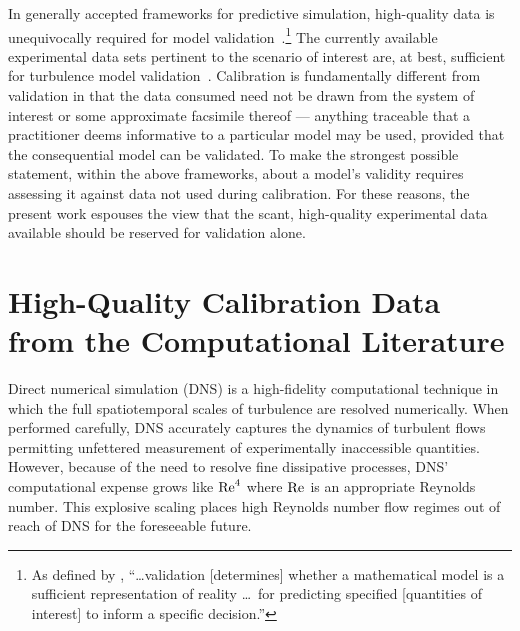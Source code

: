 In generally accepted frameworks for predictive
simulation,
high-quality data is unequivocally required for model
validation~\citep{AIAA_Guide_1998, ASME_VV10_2006, ASME_VV20_2009}.\footnote{%
    As defined by \citet{Moser2012Validating},
    ``\ldots validation [determines] whether a mathematical model is a
    sufficient representation of reality \ldots\, for predicting specified
    [quantities of interest] to inform a specific
    decision.''
}  The currently available experimental data sets pertinent to the
scenario of interest are, at best, sufficient for turbulence model
validation~\citep{Roy2006Review}.  Calibration is fundamentally different from
validation in that the data consumed need not be drawn from the system of
interest or some approximate facsimile thereof --- anything
traceable that a practitioner deems informative to a particular model may be
used, provided that the consequential model can be validated.
To make the strongest possible statement, within the above frameworks, about a
model's validity requires assessing it against data not used during calibration.
For these reasons, the present work espouses the view that the scant, high-quality
experimental data available should be reserved for validation alone.


\section[High-Quality Calibration Data from the Computational Literature]
        {High-Quality Calibration Data\\from the Computational Literature}
\label{sec:highqualitylit}

Direct numerical simulation (DNS) is a high-fidelity computational technique
in which the full spatiotemporal scales of turbulence are resolved numerically.
When performed carefully, DNS accurately captures the dynamics of turbulent
flows permitting unfettered measurement of experimentally inaccessible quantities.
However, because of the need to resolve fine dissipative processes, DNS'
computational expense grows like $\mbox{Re}_{}^4$ where $\mbox{Re}_{}$ is an
appropriate Reynolds number.  This explosive
scaling places high Reynolds number flow regimes out of reach of DNS for the foreseeable future.


